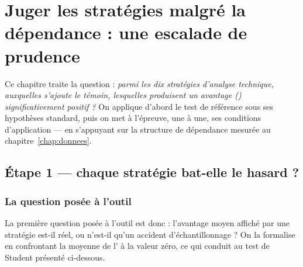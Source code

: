 \chapter{Juger les stratégies malgré la dépendance : une escalade de prudence}
\label{chap:juger}
\label{chap:bloc1} %

Ce chapitre traite la question : \emph{parmi les dix stratégies d'analyse
technique, auxquelles s'ajoute le témoin, lesquelles produisent un avantage
(\edgevar) significativement
positif ?} On applique d'abord le test de référence sous ses hypothèses
standard, puis on met à l'épreuve, une à une, ses conditions
d'application — en s'appuyant sur la structure de dépendance mesurée au
chapitre~\ref{chap:donnees}.

\section{Étape 1 --- chaque stratégie bat-elle le hasard ?}
\label{sec:b1-etape1}

\subsection{La question posée à l'outil}

La première question posée à l'outil est donc : l'avantage moyen affiché
par une stratégie est-il réel, ou n'est-il qu'un accident
d'échantillonnage ? On la formalise en confrontant la moyenne de
l'\edgevar{} à la valeur zéro, ce qui conduit au test de Student présenté
ci-dessous.

